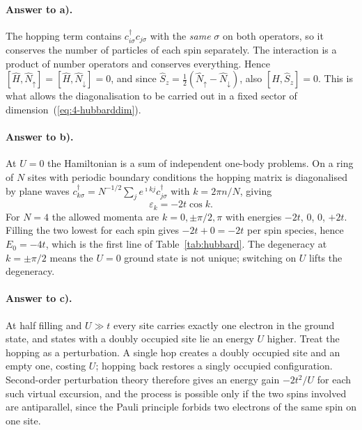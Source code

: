 \paragraph{Answer to a).}
The hopping term contains $c^{\dagger}_{i\sigma}c_{j\sigma}$ with the
\emph{same} $\sigma$ on both operators, so it conserves the number of
particles of each spin separately.  The interaction is a product of number
operators and conserves everything.  Hence $[\hat{H},\hat{N}_{\uparrow}]
=[\hat{H},\hat{N}_{\downarrow}]=0$, and since
$\hat{S}_z=\tfrac12(\hat{N}_{\uparrow}-\hat{N}_{\downarrow})$, also
$[\hat{H},\hat{S}_z]=0$.  This is what allows the diagonalisation to be
carried out in a fixed sector of dimension~(\ref{eq:4-hubbarddim}).

\paragraph{Answer to b).}
At $U=0$ the Hamiltonian is a sum of independent one-body problems.  On a ring
of $N$ sites with periodic boundary conditions the hopping matrix is
diagonalised by plane waves $c^{\dagger}_{k\sigma}=N^{-1/2}\sum_j
e^{\imath k j}c^{\dagger}_{j\sigma}$ with $k=2\pi n/N$, giving
\begin{equation}
  \varepsilon_k = -2t\cos k .
  \label{eq:4-exh1}
\end{equation}
For $N=4$ the allowed momenta are $k=0,\pm\pi/2,\pi$ with energies
$-2t$, $0$, $0$, $+2t$.  Filling the two lowest for each spin gives
$-2t+0=-2t$ per spin species, hence $E_0=-4t$, which is the first line of
Table~\ref{tab:hubbard}.  The degeneracy at $k=\pm\pi/2$ means the $U=0$
ground state is not unique; switching on $U$ lifts the degeneracy.

\paragraph{Answer to c).}
At half filling and $U\gg t$ every site carries exactly one electron in the
ground state, and states with a doubly occupied site lie an energy $U$ higher.
Treat the hopping as a perturbation.  A single hop creates a doubly occupied
site and an empty one, costing $U$; hopping back restores a singly occupied
configuration.  Second-order perturbation theory therefore gives an energy
gain $-2t^2/U$ for each such virtual excursion, and the process is possible
only if the two spins involved are antiparallel, since the Pauli principle
forbids two electrons of the same spin on one site.

